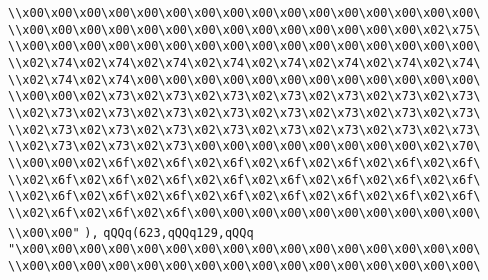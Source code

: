 \verb|\\x00\x00\x00\x00\x00\x00\x00\x00\x00\x00\x00\x00\x00\x00\x00\x00\|\newline
\verb|\\x00\x00\x00\x00\x00\x00\x00\x00\x00\x00\x00\x00\x00\x00\x02\x75\|\newline
\verb|\\x00\x00\x00\x00\x00\x00\x00\x00\x00\x00\x00\x00\x00\x00\x00\x00\|\newline
\verb|\\x02\x74\x02\x74\x02\x74\x02\x74\x02\x74\x02\x74\x02\x74\x02\x74\|\newline
\verb|\\x02\x74\x02\x74\x00\x00\x00\x00\x00\x00\x00\x00\x00\x00\x00\x00\|\newline
\verb|\\x00\x00\x02\x73\x02\x73\x02\x73\x02\x73\x02\x73\x02\x73\x02\x73\|\newline
\verb|\\x02\x73\x02\x73\x02\x73\x02\x73\x02\x73\x02\x73\x02\x73\x02\x73\|\newline
\verb|\\x02\x73\x02\x73\x02\x73\x02\x73\x02\x73\x02\x73\x02\x73\x02\x73\|\newline
\verb|\\x02\x73\x02\x73\x02\x73\x00\x00\x00\x00\x00\x00\x00\x00\x02\x70\|\newline
\verb|\\x00\x00\x02\x6f\x02\x6f\x02\x6f\x02\x6f\x02\x6f\x02\x6f\x02\x6f\|\newline
\verb|\\x02\x6f\x02\x6f\x02\x6f\x02\x6f\x02\x6f\x02\x6f\x02\x6f\x02\x6f\|\newline
\verb|\\x02\x6f\x02\x6f\x02\x6f\x02\x6f\x02\x6f\x02\x6f\x02\x6f\x02\x6f\|\newline
\verb|\\x02\x6f\x02\x6f\x02\x6f\x00\x00\x00\x00\x00\x00\x00\x00\x00\x00\|\newline
\verb|\\x00\x00"|\newline
\verb|),|\newline
\verb|qQQq(623,qQQq129,qQQq|\newline
\verb|"\x00\x00\x00\x00\x00\x00\x00\x00\x00\x00\x00\x00\x00\x00\x00\x00\|\newline
\verb|\\x00\x00\x00\x00\x00\x00\x00\x00\x00\x00\x00\x00\x00\x00\x00\x00\|\newline
